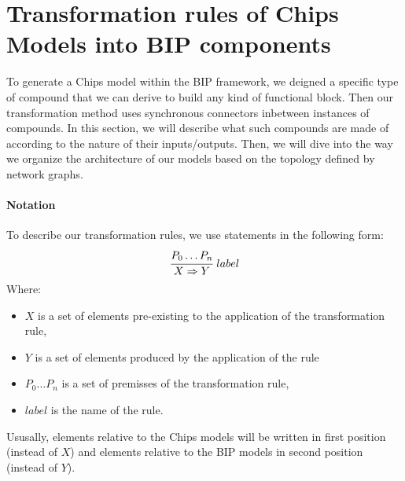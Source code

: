 \documentclass[runningheads]{llncs}
\begin{document}
\section{Transformation rules of Chips Models into BIP components}
\label{sec:Chips2Bip}

To generate a Chips model within the BIP framework, we deigned a specific type of compound that we can derive to build any kind of functional block. Then our transformation method uses synchronous connectors inbetween instances of compounds.
In this section, we will describe what such compounds are made of according to the nature of their inputs/outputs. Then, we will dive into the way we organize the architecture of our models based on the topology defined by network graphs.

\paragraph{Notation}\label{not:TransformationRule}
To describe our transformation rules, we use statements in the following form:
\[
\cfrac{P_0 \dots P_n}{X \Rightarrow Y}~label
\]
Where:
\begin{itemize}
    \item $X$ is a set of elements pre-existing to the application of the transformation rule,
    \item $Y$ is a set of elements produced by the application of the rule
    \item $P_0 \dots P_n$ is a set of premisses of the transformation rule,
    \item $label$ is the name of the rule.
\end{itemize}
Ususally, elements relative to the Chips models will be written in first position (instead of $X$) and elements relative to the BIP models in second position (instead of $Y$).
\end{document}
